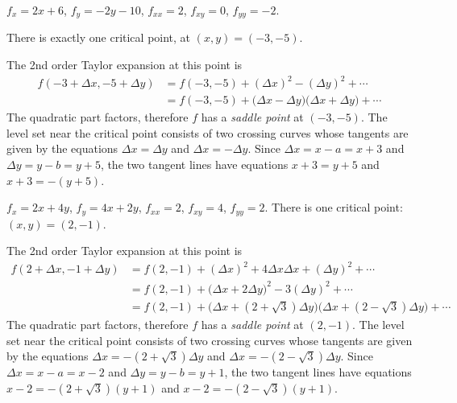 \item[{\bfseries(V6.1b)}]

$f_x = 2x+6$, $f_y = -2y-10$, $f_{xx} = 2$, $f_{xy}=0$, $f_{yy}=-2$.

There is exactly one critical point, at $(x, y) = (-3,-5)$.

The 2nd order Taylor expansion at this point is
\begin{align*}
  f(-3+\Delta x, -5+\Delta y)
  &= f(-3, -5) + (\Delta x)^2 - (\Delta y)^2 +\cdots \\
  &= f(-3, -5) +\bigl(\Delta x-\Delta y\bigr)\bigl(\Delta x +\Delta
  y\bigr)+\cdots
\end{align*}
The quadratic part factors, therefore $f$ has a
\emph{saddle point} at $(-3, -5)$.  The level set near the critical
point consists of two crossing curves whose tangents are given by the
equations $\Delta x=\Delta y$ and $\Delta x=-\Delta y$.  Since
$\Delta x=x-a=x+3$ and $\Delta y = y-b = y+5$, the two tangent lines
have equations $x+3 = y+5$ and $x+3 = -(y+5)$.
%

\bigskip

\item[{\bfseries(V6.1c)}]

$f_x = 2x+4y$, $f_y = 4x+2y$, $f_{xx} = 2$, $f_{xy}=4$, $f_{yy}=2$.
There is one critical point: $(x,y) = (2, -1)$.

The 2nd order Taylor expansion at this point is
\begin{align*}
f(2+\Delta x, -1+\Delta y)
&= f(2, -1) + (\Delta x)^2 + 4 \Delta x \Delta x
            + (\Delta y)^2 +\cdots\\
&= f(2, -1) + \bigl(\Delta x+2\Delta y\bigr)^{2}
            - 3(\Delta y)^2+\cdots\\
&= f(2, -1) + \bigl(\Delta x+(2+\surd3)\Delta y\bigr)
              \bigl(\Delta x+(2-\surd3)\Delta y\bigr)
            +\cdots
\end{align*}
%
The quadratic part factors, therefore $f$ has a
\emph{saddle point} at $(2, -1)$.  The level set near the critical
point consists of two crossing curves whose tangents are given by the
equations $\Delta x=-(2+\surd 3)\Delta y$ and $\Delta x=-(2-\surd
3)\Delta y$.  Since $\Delta x=x-a=x-2$ and $\Delta y = y-b = y+1$, the
two tangent lines have equations $x-2 = -(2+\surd3)(y+1)$ and
$x-2 = -(2-\surd3)(y+1)$.
\bigskip

